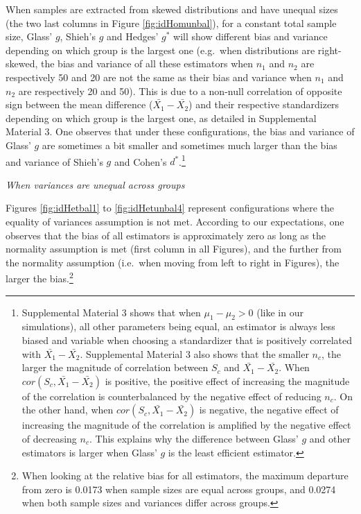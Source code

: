 \documentclass[
  english,
  man,floatsintext]{apa6}
\begin{document}
When samples are extracted from skewed distributions and have unequal sizes (the two last columns in Figure \ref{fig:idHomunbal}), for a constant total sample size, Glass' \(g\), Shieh's \(g\) and Hedges' \(g^*\) will show different bias and variance depending on which group is the largest one (e.g.~when distributions are right-skewed, the bias and variance of all these estimators when \(n_1\) and \(n_2\) are respectively 50 and 20 are not the same as their bias and variance when \(n_1\) and \(n_2\) are respectively 20 and 50). This is due to a non-null correlation of opposite sign between the mean difference (\(\bar{X_1}-\bar{X_2}\)) and their respective standardizers depending on which group is the largest one, as detailed in Supplemental Material 3. One observes that under these configurations, the bias and variance of Glass' \(g\) are sometimes a bit smaller and sometimes much larger than the bias and variance of Shieh's \(g\) and Cohen's \(d^*\).\footnote{Supplemental Material 3 shows that when $\mu_1-\mu_2 >0$ (like in our simulations), all other parameters being equal, an estimator is always less biased and variable when choosing a standardizer that is positively correlated with $\bar{X_1}-\bar{X_2}$. Supplemental Material 3 also shows that the smaller $n_c$, the larger the magnitude of correlation between $S_c$ and $\bar{X_1}-\bar{X_2}$. When $cor(S_c,\bar{X_1}-\bar{X_2})$ is positive, the positive effect of increasing the magnitude of the correlation is counterbalanced by the negative effect of reducing $n_c$. On the other hand, when $cor(S_c,\bar{X_1}-\bar{X_2})$ is negative, the negative effect of increasing the magnitude of the correlation is amplified by the negative effect of decreasing $n_c$. This explains why the difference between Glass' $g$ and other estimators is larger when Glass' $g$ is the least efficient estimator.}

\emph{When variances are unequal across groups}

Figures \ref{fig:idHetbal1} to \ref{fig:idHetunbal4} represent configurations where the equality of variances assumption is not met. According to our expectations, one observes that the bias of all estimators is approximately zero as long as the normality assumption is met (first column in all Figures), and the further from the normality assumption (i.e.~when moving from left to right in Figures), the larger the bias.\footnote{When looking at the relative bias for all estimators, the maximum departure from zero is 0.0173 when sample sizes are equal across groups, and 0.0274 when both sample sizes and variances differ across groups.}
\end{document}
